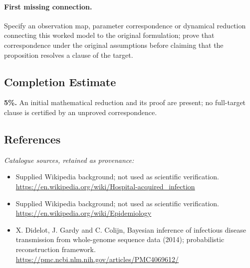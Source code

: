 \documentclass[11pt]{article}
\begin{document}
\paragraph{First missing connection.} Specify an observation map, parameter correspondence or dynamical reduction connecting this worked model to the original formulation; prove that correspondence under the original assumptions before claiming that the proposition resolves a clause of the target.
\subsection{Completion Estimate}
\textbf{5\%.} An initial mathematical reduction and its proof are present; no full-target clause is certified by an unproved correspondence.
\subsection{References}
\noindent\emph{Catalogue sources, retained as provenance:}
\begin{itemize}
\item Supplied Wikipedia background; not used as scientific verification. \url{https://en.wikipedia.org/wiki/Hospital-acquired_infection}
\item Supplied Wikipedia background; not used as scientific verification. \url{https://en.wikipedia.org/wiki/Epidemiology}
\item X. Didelot, J. Gardy and C. Colijn, Bayesian inference of infectious disease transmission from whole-genome sequence data (2014); probabilistic reconstruction framework. \url{https://pmc.ncbi.nlm.nih.gov/articles/PMC4069612/}
\end{itemize}
\end{document}
